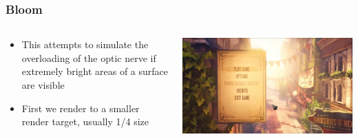 \begin{frame}
	\frametitle{Bloom}
	\begin{columns}
		\begin{column}{0.5\textwidth}
			\begin{itemize}
				\item This attempts to simulate the overloading of the optic nerve if extremely bright areas of a surface are visible
				\item First we render to a smaller render target, usually 1/4 size
			\end{itemize}
		\end{column}
		\begin{column}{0.5\textwidth} 
			\begin{center}
				\includegraphics[width=\textwidth]{bloom}
			\end{center}
		\end{column}
	\end{columns}	
\end{frame}

